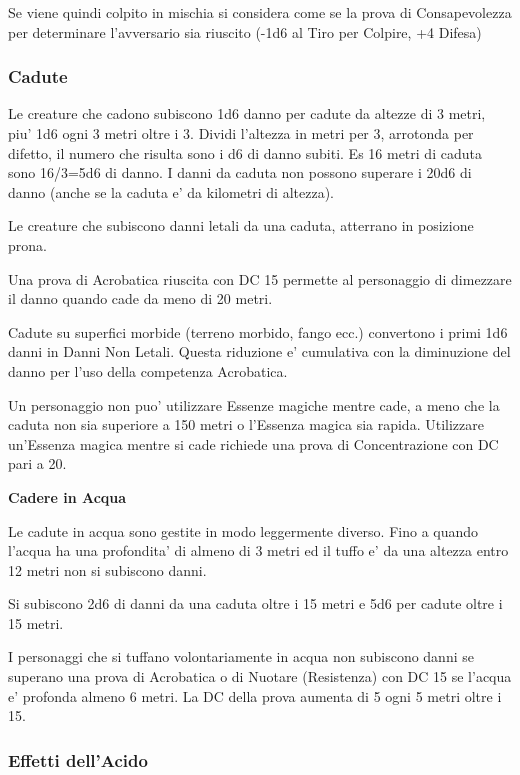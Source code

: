 \documentclass[a4paper,11pt,twoside,openany]{book}
\begin{document}
{Se viene quindi colpito in mischia si considera come se la prova di Consapevolezza per determinare l'avversario sia riuscito (-1d6 al Tiro per Colpire, +4 Difesa)

\subsubsection{Cadute}

\label{cadute}

Le creature che cadono subiscono 1d6 danno per cadute da altezze di 3 metri, piu' 1d6 ogni 3 metri oltre i 3. Dividi l'altezza in metri per 3, arrotonda per difetto, il numero che risulta sono i d6 di danno subiti. Es 16 metri di caduta sono 16/3=5d6 di danno. I danni da caduta non possono superare i 20d6 di danno (anche se la caduta e' da kilometri di altezza).

Le creature che subiscono danni letali da una caduta, atterrano in posizione prona.

Una prova di Acrobatica riuscita con DC 15 permette al personaggio di dimezzare il danno quando cade da meno di 20 metri.

Cadute su superfici morbide (terreno morbido, fango ecc.) convertono i primi 1d6 danni in Danni Non Letali. Questa riduzione e' cumulativa con la diminuzione del danno per l'uso della competenza Acrobatica.

Un personaggio non puo' utilizzare Essenze magiche mentre cade, a meno che la caduta non sia superiore a 150 metri o l'Essenza magica sia rapida. Utilizzare un'Essenza magica mentre si cade richiede una prova di Concentrazione con DC pari a 20.

\textbf{Cadere in Acqua}

Le cadute in acqua sono gestite in modo leggermente diverso. Fino a quando l'acqua ha una profondita' di almeno di 3 metri ed il tuffo e' da una altezza entro 12 metri non si subiscono danni.

Si subiscono 2d6 di danni da una caduta oltre i 15 metri e 5d6 per cadute oltre i 15 metri.

I personaggi che si tuffano volontariamente in acqua non subiscono danni se superano una prova di Acrobatica o di Nuotare (Resistenza) con DC 15 se l'acqua e' profonda almeno 6 metri. La DC della prova aumenta di 5 ogni 5 metri oltre i 15.

\subsubsection{Effetti dell'Acido}

}
\end{document}

